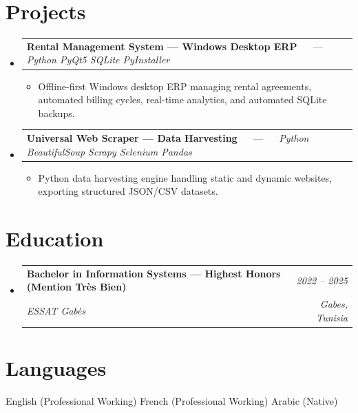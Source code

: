 \documentclass[letterpaper,9pt]{article}
\makeatletter
\newcommand{\resumeItem}[1]{\item\small{#1}}
\newcommand{\resumeSubheading}[4]{
  \vspace{-1pt}\item
  \begin{tabular*}{0.97\textwidth}[t]{l@{\extracolsep{\fill}}r}
    \textbf{#1} & \textit{\color{greytext}#2} \\
    \textit{\small\color{greytext} #3} & \textit{\small\color{greytext} #4}
  \end{tabular*}\vspace{-2pt}
}
\newcommand{\resumeProjectHeading}[2]{
  \item
  \begin{tabular*}{0.97\textwidth}{l@{\extracolsep{\fill}}r}
    \small #1 & #2
  \end{tabular*}\vspace{-1pt}
}
\newcommand{\resumeSubHeadingListStart}{\begin{itemize}[leftmargin=0.18in, label={}, itemsep=1.2pt, topsep=2.5pt, parsep=0pt]}
\newcommand{\resumeSubHeadingListEnd}{\end{itemize}\vspace{-2pt}}
\newcommand{\resumeProjectListStart}{\begin{itemize}[leftmargin=0.24in, label={}, itemsep=0.9pt, topsep=1.2pt, parsep=0pt]}
\newcommand{\resumeProjectListEnd}{\end{itemize}\vspace{-2pt}}
\makeatother
\begin{document}
\section{Projects}
\resumeSubHeadingListStart

  \resumeProjectHeading{\textbf{Rental Management System --- Windows Desktop ERP} $\quad$ --- $\quad$ \emph{\color{greytext}Python \textperiodcentered{} PyQt5 \textperiodcentered{} SQLite \textperiodcentered{} PyInstaller}}{}
    \resumeProjectListStart
      \resumeItem{Offline-first Windows desktop ERP managing rental agreements, automated billing cycles, real-time analytics, and automated SQLite backups.}
    \resumeProjectListEnd

  \resumeProjectHeading{\textbf{Universal Web Scraper --- Data Harvesting} $\quad$ --- $\quad$ \emph{\color{greytext}Python \textperiodcentered{} BeautifulSoup \textperiodcentered{} Scrapy \textperiodcentered{} Selenium \textperiodcentered{} Pandas}}{}
    \resumeProjectListStart
      \resumeItem{Python data harvesting engine handling static and dynamic websites, exporting structured JSON/CSV datasets.}
    \resumeProjectListEnd

\resumeSubHeadingListEnd\vspace{-3pt}

\section{Education}
\resumeSubHeadingListStart
  \resumeSubheading{Bachelor in Information Systems --- Highest Honors (Mention Très Bien)}{2022 -- 2025}{ESSAT Gabès}{Gabes, Tunisia}
\resumeSubHeadingListEnd\vspace{-1pt}

\section{Languages}
\begin{itemize}[leftmargin=0.18in, label={}, topsep=2pt, itemsep=1pt, parsep=0pt]
\footnotesize{
  \item English (Professional Working) \textperiodcentered{} French (Professional Working) \textperiodcentered{} Arabic (Native)
}
\end{itemize}
\end{document}

